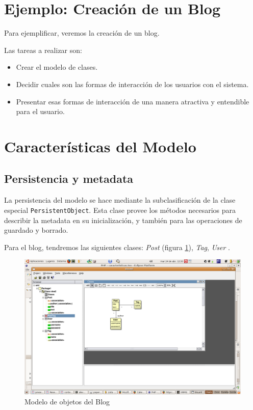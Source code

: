 \section{Ejemplo: Creación de un Blog}
Para ejemplificar, veremos la creación de un blog.

Las tareas a realizar son:
\begin{itemize}
\item Crear el modelo de clases.
\item Decidir cuales son las formas de interacción de los usuarios con el sistema.
\item Presentar esas formas de interacción de una manera atractiva y entendible para el usuario.
\end{itemize}

\section{Características del Modelo}

\subsection{Persistencia y metadata}
\label{sub-pers}

La persistencia del modelo se hace mediante la subclasificación de la clase especial \verb"PersistentObject".
Esta clase provee los métodos necesarios para describir la metadata en su inicialización, y también para las operaciones de guardado y borrado.

Para el blog, tendremos las siguientes clases: \emph{Post} (figura \ref{fig-model1}), \emph{Tag}, \emph{User} .

\begin{figure}
	\centering
	\includegraphics*[scale=0.60,viewport=420 350 700 600]{images/diagrama.png}
 	\caption{Modelo de objetos del Blog}
 	\label{fig-model1}
\end{figure}

